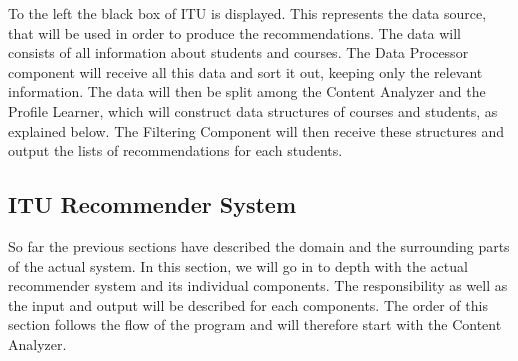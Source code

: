 To the left the black box of ITU is displayed. This represents the data source, that will be used in order to produce the recommendations. The data will consists of all information about students and courses. The Data Processor component will receive all this data and sort it out, keeping only the relevant information. The data will then be split among the Content Analyzer and the Profile Learner, which will construct data structures of courses and students, as explained below. The Filtering Component will then receive these structures and output the lists of recommendations for each students. 


\subsection{ITU Recommender System}
So far the previous sections have described the domain and the surrounding parts of the actual system. In this section, we will go in to depth with the actual recommender system and its individual components. The responsibility as well as the input and output will be described for each components. The order of this section follows the flow of the program and will therefore start with the Content Analyzer.
